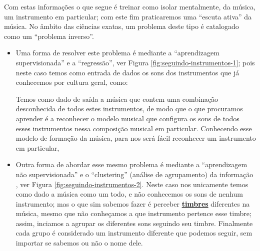 Com estas informações o que segue é treinar como isolar mentalmente, da música, 
um instrumento em particular;
com este fim praticaremos uma ``escuta ativa'' da música. 
No âmbito das ciências exatas, um problema deste tipo é catalogado como um ``problema inverso''.
\begin{itemize}
\item Uma forma de resolver este problema é mediante a ``aprendizagem supervisionada'' 
e  a ``regressão'', ver Figura \ref{fig:seguindo-instrumentos-1};
pois neste caso temos como entrada de dados os sons dos instrumentos que já conhecemos por cultura geral,
como: 
Temos como dado de saída a música que contem uma combinação desconhecida de todos estes instrumentos,
de modo que o que procuramos aprender é a reconhecer o modelo musical 
que configura os sons de todos esses instrumentos
nessa composição musical em particular.
Conhecendo esse modelo de formação da música, 
para nos será fácil reconhecer um instrumento em particular,

\item Outra forma de abordar esse mesmo problema é mediante a ``aprendizagem não supervisionada'' 
e  o ``clustering'' (análise de agrupamento) da informação , ver Figura \ref{fig:seguindo-instrumentos-2}.
Neste caso nos unicamente temos como dado a música como um todo,
e não conhecemos os sons de nenhum instrumento;
mas o que sim sabemos fazer é perceber 
\hyperref[sec:pos:timbre]{\textbf{timbres}} diferentes na música,
mesmo que não conheçamos a que instrumento pertence esse timbre;
assim, inciamos a agrupar os diferentes sons seguindo seu timbre.
Finalmente cada grupo é considerado um instrumento diferente que podemos seguir,
sem importar se sabemos ou não o nome dele.
\end{itemize}
